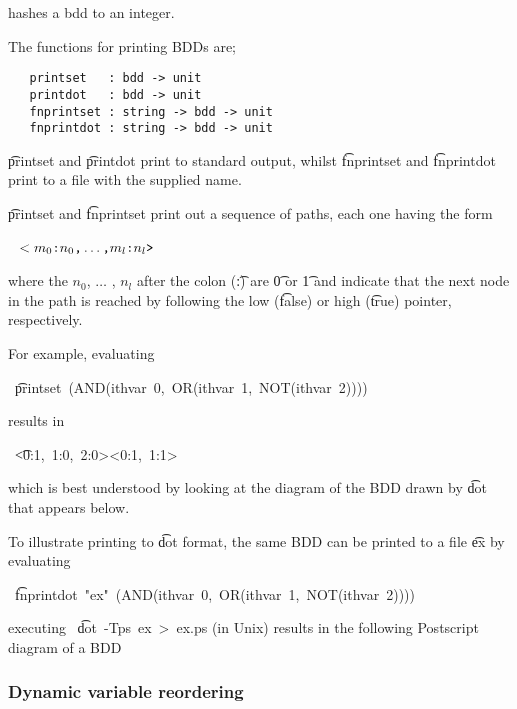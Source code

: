 hashes a bdd to an integer.

The functions for printing BDDs are;

\begin{verbatim}
   printset   : bdd -> unit
   printdot   : bdd -> unit
   fnprintset : string -> bdd -> unit
   fnprintdot : string -> bdd -> unit
\end{verbatim}

\t{printset} and \t{printdot} print to standard output, whilst
\t{fnprintset} and \t{fnprintdot} print to a file with the supplied
name.

\t{printset} and \t{fnprintset} print out a sequence of paths, each one having the form

\smallskip

~$\mbox{\tt }<m_0\mbox{\tt :}n_0\mbox{\tt ,} \ldots \mbox{\tt ,} m_l\mbox{\tt :}n_l\mbox{\tt >}$

\smallskip

where the $n_0$, $\ldots$ , $n_l$ after the colon (\t{:}) are \t{0} or
\t{1} and indicate that the next node in the path is reached by
following the low ({\t{false}}) or high ({\t{true}}) pointer,
respectively. 

For
example, evaluating

\smallskip
~\t{printset~(AND(ithvar~0,~OR(ithvar~1,~NOT(ithvar~2))))}
\smallskip

results in

\smallskip
~\t{<0:1,~1:0,~2:0><0:1,~1:1>}
\smallskip

which is best understood by looking at the diagram of the BDD drawn by
\t{dot} that appears below.

To illustrate printing to \t{dot} format,  the same BDD can be
printed to a file \t{ex} by evaluating

\smallskip
~\t{fnprintdot~"ex"~(AND(ithvar~0,~OR(ithvar~1,~NOT(ithvar~2))))}
\smallskip

executing ~\t{dot~-Tps~ex~>~ex.ps} (in Unix) results in
the following Postscript diagram of a BDD

\begin{center}
\end{center}

\subsubsection{Dynamic variable reordering}

